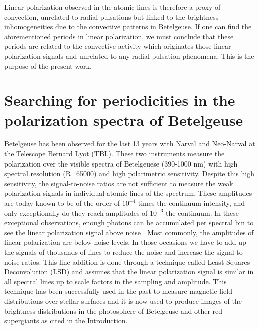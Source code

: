 \documentclass{aa}
\begin{document}
Linear polarization observed in the atomic lines is therefore a proxy of convection, unrelated to radial 
pulsations but linked to the brightness inhomogeneities due to the convective patterns in Betelgeuse. If one can find the aforementioned periods 
in linear polarization, we must conclude that these periods are related to the convective activity which originates those linear polarization signals
and unrelated to any radial pulsation phenomena. This is the purpose of the present work.



\section{Searching for periodicities in the polarization spectra of Betelgeuse}

Betelgeuse has been observed for the last 13 years with Narval and Neo-Narval at the Telescope Bernard Lyot (TBL). These two instruments measure the polarization 
over the visible spectra of Betelgeuese (390-1000 nm) with high spectral resolution (R=65000) and high polarimetric sensitivity. Despite 
this high sensitivity, the signal-to-noise ratios are not sufficient to measure the weak polarization signals in individual atomic lines of the 
spectrum. These amplitudes are today known to be of the order of $10^{-4}$ times the continuum intensity, and only exceptionally do they 
reach amplitudes of $10^{-3}$ the continuum. In these exceptional observations, enough photons can be accumulated per spectral bin to 
see the linear polarization signal above noise \citep{auriere_discovery_2016}. Most commonly, the amplitudes of linear polarization are below noise levels. In those 
occasions we have to add up the signals of thousands of lines to reduce the noise and increase the signal-to-noise ratios. This line addition 
is done through a technique called Least-Squares Deconvolution (LSD) \citep{donati_spectropolarimetric_1997} and assumes that the 
linear polarization signal is similar 
in all spectral lines up to scale factors in the sampling and amplitude. This technique has been successfully used in the past to measure 
magnetic field distributions over stellar surfaces and it is now used to produce images of the brightness distributions in the photosphere 
of Betelgeuse and other red supergiants as cited in the Introduction. 
\end{document}
